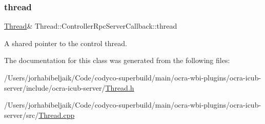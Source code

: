 \subsubsection{\texorpdfstring{thread}{thread}}
{\footnotesize\ttfamily \hyperlink{classThread}{Thread}\& Thread\+::\+Controller\+Rpc\+Server\+Callback\+::thread\hspace{0.3cm}{\ttfamily [private]}}

A shared pointer to the control thread. 

The documentation for this class was generated from the following files\+:\begin{DoxyCompactItemize}
\item 
/\+Users/jorhabibeljaik/\+Code/codyco-\/superbuild/main/ocra-\/wbi-\/plugins/ocra-\/icub-\/server/include/ocra-\/icub-\/server/\hyperlink{Thread_8h}{Thread.\+h}\item 
/\+Users/jorhabibeljaik/\+Code/codyco-\/superbuild/main/ocra-\/wbi-\/plugins/ocra-\/icub-\/server/src/\hyperlink{Thread_8cpp}{Thread.\+cpp}\end{DoxyCompactItemize}
